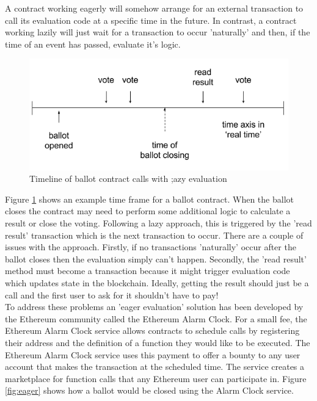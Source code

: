 A contract working eagerly will somehow arrange for an external transaction to call its evaluation code at a specific time in the future. In contrast, a contract working lazily will just wait for a transaction to occur 'naturally' and then, if the time of an event has passed, evaluate it's logic.\\
\begin{figure}
\centering
\includegraphics[width=\textwidth]{Figures/lazy}
\decoRule
\caption[]{Timeline of ballot contract calls with ;azy evaluation}
\label{fig:lazy}
\end{figure}
Figure \ref{fig:lazy} shows an example time frame for a ballot contract. When the ballot closes the contract may need to perform some additional logic to calculate a result or close the voting. Following a lazy approach, this is triggered by the 'read result' transaction which is the next transaction to occur. There are a couple of issues with the approach. Firstly, if no transactions 'naturally' occur after the ballot closes then the evaluation simply can't happen. Secondly, the 'read result' method must become a transaction because it might trigger evaluation code which updates state in the blockchain. Ideally, getting the result should just be a call and the first user to ask for it shouldn't have to pay!\\

To address these problems an 'eager evaluation' solution has been developed by the Ethereum community called the Ethereum Alarm Clock. For a small fee, the Ethereum Alarm Clock service allows contracts to schedule calls by registering their address and the definition of a function they would like to be executed. The Ethereum Alarm Clock service uses this payment to offer a bounty to any user account that makes the transaction at the scheduled time. The service creates a marketplace for function calls that any Ethereum user can participate in. Figure \ref{fig:eager} shows how a ballot would be closed using the Alarm Clock service.\\

